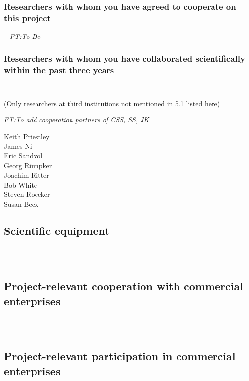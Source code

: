 \documentclass[11pt]{article}
\providecommand{\currfilename}{}
\newcommand{\showfile}{{\bf \tt \color{blue} \currfilename}}
\newcommand{\noteft}[1]{{\it \color{magenta} FT:#1}}
\newcommand{\noteft}[1]{}
\newcommand{\showfile}{}
\begin{document}
\subsubsection{Researchers with whom you have agreed to cooperate on this project}
\showfile
\noteft{To Do}

\subsubsection{Researchers with whom you have collaborated scientifically within the past three years}
\showfile

{\footnotesize (Only researchers at third institutions not mentioned in 5.1 listed here)

\noteft{To add cooperation partners of CSS, SS, JK}
\begin{multicols}{4}
\begin{flushleft}
Keith Priestley\\
James Ni \\
Eric Sandvol\\
Georg Rümpker\\
Joachim Ritter\\
Bob White \\
Steven Roecker \\
Susan Beck
\end{flushleft}
\end{multicols}

\subsection{Scientific equipment}
\\
\showfile


\subsection{Project-relevant cooperation with commercial enterprises}
\\
\showfile


\subsection{Project-relevant participation in commercial enterprises}
\\
\showfile


}
\end{document}
